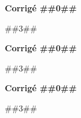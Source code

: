 
\begin{minipage}{\linewidth}

\raggedcolumns
\setlength{\columnseprule}{0.5pt}
\begin{multicols}{3}

\textbf{Corrigé ##{{0}}##} \par
##{{3}}##

\columnbreak

\textbf{Corrigé ##{{0}}##} \par
##{{3}}##

\columnbreak

\textbf{Corrigé ##{{0}}##} \par
##{{3}}##

\end{multicols}
\end{minipage}

